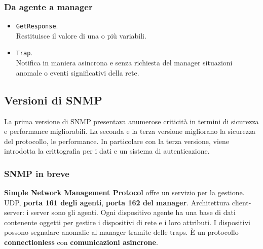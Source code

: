\subsubsection{Da agente a manager}
\begin{itemize}
    \item \verb|GetResponse|.\\
    Restituisce il valore di una o più variabili.
    \item \verb|Trap|.\\
    Notifica in maniera asincrona e senza richiesta del manager situazioni anomale o eventi significativi della rete.
\end{itemize}

\subsection{Versioni di SNMP}
La prima versione di SNMP presentava anumerose criticità in termini di sicurezza e performance migliorabili. La seconda e la terza versione migliorano la sicurezza del protocollo, le performance. In particolare con la terza versione, viene introdotta la crittografia per i dati e un sistema di autenticazione.

\subsubsection{SNMP in breve}
\textbf{Simple Network Management Protocol} offre un servizio per la gestione. UDP, \textbf{porta 161 degli agenti}, \textbf{porta 162 del manager}. Architettura client-server: i server sono gli agenti. Ogni dispositivo agente ha una base di dati contenente oggetti per gestire i dispositivi di rete e i loro attributi. I dispositivi possono segnalare anomalie al manager tramite delle traps. È un protocollo \textbf{connectionless} con \textbf{comunicazioni asincrone}.

